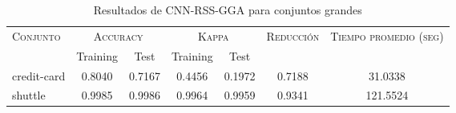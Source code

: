 \begin{table}[]
\centering
\begin{tabular}{l c c c c c c}
\hline
\multirow{2}{*}{\textsc{Conjunto}}
	& \multicolumn{2}{c}{\textsc{Accuracy}}
	& \multicolumn{2}{c}{\textsc{Kappa}}
	& \textsc{Reducción}
	& \textsc{Tiempo promedio (seg)} \\
	& Training & Test
	& Training & Test \\ 
\hline
\hline

credit-card & 0.8040 & 0.7167 & 0.4456 & 0.1972 & 0.7188 & 31.0338 \\
shuttle & 0.9985 & 0.9986 & 0.9964 & 0.9959 & 0.9341 & 121.5524 \\

\hline
\end{tabular}
\caption{Resultados de CNN-RSS-GGA para conjuntos grandes }
\label{res-grande-cnn-rss-gga}
\end{table}

